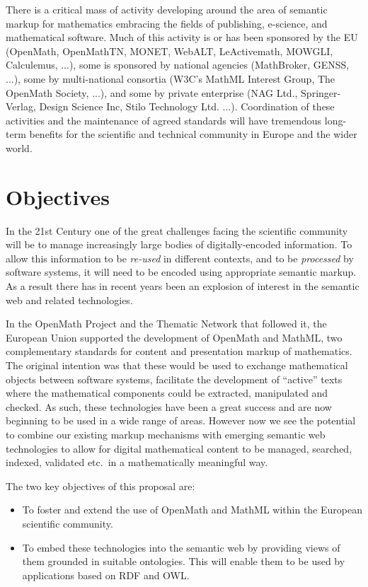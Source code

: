 \documentclass{euproposal}
\begin{document}
There is a critical mass of activity developing around the area of
semantic markup for mathematics embracing the fields of publishing,
e-science, and mathematical software.  Much of this activity is or has
been sponsored by the EU (OpenMath, OpenMathTN, MONET, WebALT,
LeActivemath, MOWGLI, Calculemus, ...), some is sponsored by national
agencies (MathBroker, GENSS, ...), some by multi-national consortia
(W3C's MathML Interest Group, The OpenMath Society, ...), and some by
private enterprise (NAG Ltd., Springer-Verlag, Design Science Inc,
Stilo Technology Ltd. ...).  Coordination of these activities and the
maintenance of agreed standards will have tremendous long-term
benefits for the scientific and technical community in Europe and the
wider world.




\chapter{Objectives}\label{cha:object}

In the 21st Century one of the great challenges facing the scientific
community will be to manage increasingly large bodies of
digitally-encoded information.  To allow this information to be
\emph{re-used} in different contexts, and to be \emph{processed} by
software systems,
it will need to be encoded using appropriate semantic markup.  As a
result there has in recent years been an explosion of interest in the
semantic web and related technologies.

In the OpenMath Project and the Thematic Network that followed it, the
European Union supported the development of OpenMath and MathML, two
complementary standards for content and presentation markup of
mathematics.  The original intention was that these would be used to
exchange mathematical objects between software systems, facilitate the
development of ``active'' texts where the mathematical components
could be extracted, manipulated and checked.  As such, these
technologies have been a great success and are now beginning to be
used in a wide range of areas.  However now we see the potential to
combine our existing markup mechanisms with emerging semantic web
technologies to allow for digital mathematical content to be managed,
searched, indexed, validated etc.~in a mathematically meaningful way.

The two key objectives of this proposal are:
\begin{itemize}
\item To foster and extend the use of OpenMath and MathML within the
  European scientific community.
\item To embed these technologies into the semantic web by providing
  views of them grounded in suitable ontologies.  This will enable
  them to be used by applications based on RDF and OWL.
\end{itemize}
\end{document}

